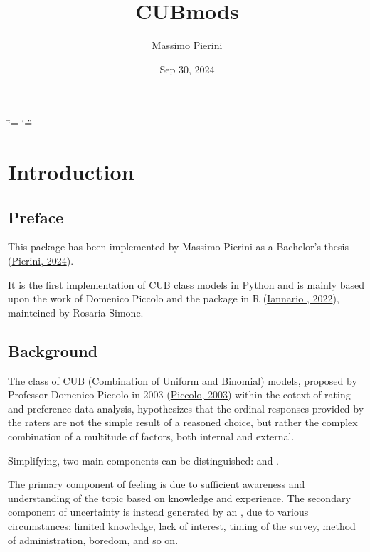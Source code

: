\documentclass[letterpaper,10pt,english]{sphinxmanual}
\title{CUBmods}
\date{Sep 30, 2024}
\author{Massimo Pierini}
\begin{document}
\ifdefined\shorthandoff
  \ifnum\catcode`\=\string=\active\shorthandoff{=}\fi
  \ifnum\catcode`\"=\active{}\fi
\fi

\pagestyle{empty}
\sphinxmaketitle
\pagestyle{plain}
\sphinxtableofcontents
\pagestyle{normal}
\label{\detokenize{index::doc}}


\sphinxstepscope


\chapter{Introduction}
\label{\detokenize{intro:introduction}}\label{\detokenize{intro::doc}}

\section{Preface}
\label{\detokenize{intro:preface}}
\sphinxAtStartPar
This package has been implemented by Massimo Pierini as a Bachelor’s thesis (\hyperlink{cite.references:id41}{Pierini, 2024}).

\sphinxAtStartPar
It is the first implementation of CUB class models in Python and is mainly based upon
the work of Domenico Piccolo and the  package in R (\hyperlink{cite.references:id22}{Iannario , 2022}),
mainteined by Rosaria Simone.


\section{Background}
\label{\detokenize{intro:background}}
\sphinxAtStartPar
The class of CUB (Combination of Uniform and Binomial) models, proposed by Professor Domenico Piccolo in
2003 (\hyperlink{cite.references:id4}{Piccolo, 2003}) within the cotext of rating and preference data analysis, hypothesizes that
the ordinal responses provided by the raters are not the simple result of a reasoned choice, but rather the
complex combination of a multitude of factors, both internal and external.

\sphinxAtStartPar
Simplifying, two main components can be distinguished:
 and .

\sphinxAtStartPar
The primary component of feeling
is due to sufficient awareness and understanding of the topic based on
knowledge and experience.
The secondary component of uncertainty is instead generated by an , due to
various circumstances: limited knowledge, lack of interest, timing of the survey, method of
administration, boredom, and so on.
\end{document}
